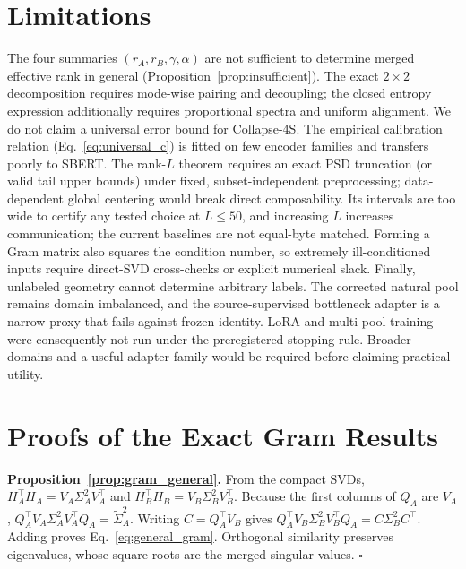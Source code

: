 \documentclass{article}
\begin{document}



\appendix

\section{Limitations}
\label{app:limitations}

The four summaries $(r_A,r_B,\gamma,\alpha)$ are not sufficient to
determine merged effective rank in general
(Proposition~\ref{prop:insufficient}).  The exact $2\times2$ decomposition
requires mode-wise pairing and decoupling; the closed entropy expression
additionally requires proportional spectra and uniform alignment.  We do
not claim a universal error bound for Collapse-4S.  The empirical
calibration relation (Eq.~\ref{eq:universal_c}) is fitted on few encoder
families and transfers poorly to SBERT.  The rank-$L$ theorem requires an
exact PSD truncation (or valid tail upper bounds) under fixed,
subset-independent preprocessing; data-dependent global centering would
break direct composability.  Its intervals are too wide to certify any tested
choice at $L\leq50$, and increasing $L$ increases communication; the current
baselines are not equal-byte matched.  Forming a Gram matrix also squares the
condition number, so extremely ill-conditioned inputs require direct-SVD
cross-checks or explicit numerical slack.  Finally, unlabeled geometry cannot
determine arbitrary labels.  The corrected natural pool remains domain
imbalanced, and the source-supervised bottleneck adapter is a narrow proxy that
fails against frozen identity.  LoRA and multi-pool training were consequently
not run under the preregistered stopping rule.  Broader domains and a useful
adapter family would be required before claiming practical utility.

\section{Proofs of the Exact Gram Results}
\label{app:proof_thm}

\textbf{Proposition~\ref{prop:gram_general}.}
From the compact SVDs,
$H_A^\top H_A=V_A\Sigma_A^2V_A^\top$ and
$H_B^\top H_B=V_B\Sigma_B^2V_B^\top$.
Because the first columns of $Q_A$ are $V_A$,
$Q_A^\top V_A\Sigma_A^2V_A^\top Q_A=\widetilde\Sigma_A^2$.
Writing $C=Q_A^\top V_B$ gives
$Q_A^\top V_B\Sigma_B^2V_B^\top Q_A=C\Sigma_B^2C^\top$.
Adding proves Eq.~\eqref{eq:general_gram}.  Orthogonal similarity preserves
eigenvalues, whose square roots are the merged singular values. $\square$
\end{document}
